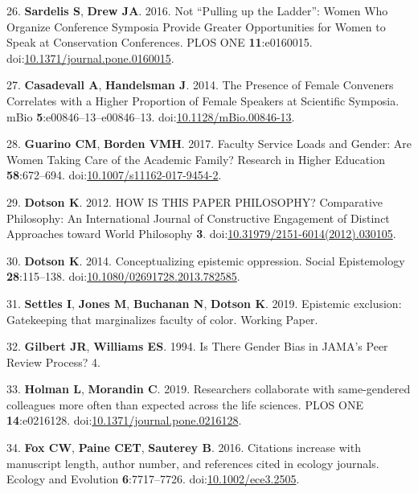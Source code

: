 \documentclass[11pt,]{article}
\begin{document}
\hypertarget{ref-sardelis_not_2016}{}
26. \textbf{Sardelis S}, \textbf{Drew JA}. 2016. Not ``Pulling up the
Ladder'': Women Who Organize Conference Symposia Provide Greater
Opportunities for Women to Speak at Conservation Conferences. PLOS ONE
\textbf{11}:e0160015.
doi:\href{https://doi.org/10.1371/journal.pone.0160015}{10.1371/journal.pone.0160015}.

\hypertarget{ref-casadevall_presence_2014}{}
27. \textbf{Casadevall A}, \textbf{Handelsman J}. 2014. The Presence of
Female Conveners Correlates with a Higher Proportion of Female Speakers
at Scientific Symposia. mBio \textbf{5}:e00846--13--e00846--13.
doi:\href{https://doi.org/10.1128/mBio.00846-13}{10.1128/mBio.00846-13}.

\hypertarget{ref-guarino_faculty_2017}{}
28. \textbf{Guarino CM}, \textbf{Borden VMH}. 2017. Faculty Service
Loads and Gender: Are Women Taking Care of the Academic Family? Research
in Higher Education \textbf{58}:672--694.
doi:\href{https://doi.org/10.1007/s11162-017-9454-2}{10.1007/s11162-017-9454-2}.

\hypertarget{ref-Dotson2012}{}
29. \textbf{Dotson K}. 2012. HOW IS THIS PAPER PHILOSOPHY? Comparative
Philosophy: An International Journal of Constructive Engagement of
Distinct Approaches toward World Philosophy \textbf{3}.
doi:\href{https://doi.org/10.31979/2151-6014(2012).030105}{10.31979/2151-6014(2012).030105}.

\hypertarget{ref-Dotson2014}{}
30. \textbf{Dotson K}. 2014. Conceptualizing epistemic oppression.
Social Epistemology \textbf{28}:115--138.
doi:\href{https://doi.org/10.1080/02691728.2013.782585}{10.1080/02691728.2013.782585}.

\hypertarget{ref-settles_epistemic_2019}{}
31. \textbf{Settles I}, \textbf{Jones M}, \textbf{Buchanan N},
\textbf{Dotson K}. 2019. Epistemic exclusion: Gatekeeping that
marginalizes faculty of color. Working Paper.

\hypertarget{ref-gilbert_is_1994}{}
32. \textbf{Gilbert JR}, \textbf{Williams ES}. 1994. Is There Gender
Bias in JAMA's Peer Review Process? 4.

\hypertarget{ref-holman_researchers_2019}{}
33. \textbf{Holman L}, \textbf{Morandin C}. 2019. Researchers
collaborate with same-gendered colleagues more often than expected
across the life sciences. PLOS ONE \textbf{14}:e0216128.
doi:\href{https://doi.org/10.1371/journal.pone.0216128}{10.1371/journal.pone.0216128}.

\hypertarget{ref-fox_citations_2016}{}
34. \textbf{Fox CW}, \textbf{Paine CET}, \textbf{Sauterey B}. 2016.
Citations increase with manuscript length, author number, and references
cited in ecology journals. Ecology and Evolution \textbf{6}:7717--7726.
doi:\href{https://doi.org/10.1002/ece3.2505}{10.1002/ece3.2505}.
\end{document}
